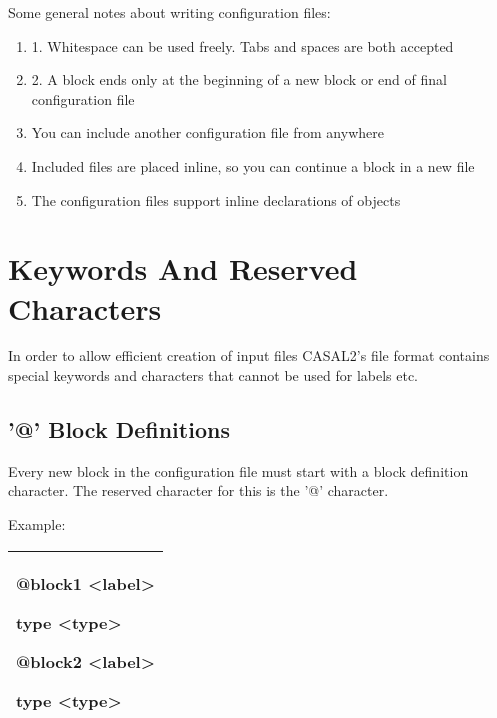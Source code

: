 \documentclass[a4paper,11pt,twoside,pdftex,draft]{article}
\providecommand{\tightlist}{%
  \setlength{\itemsep}{0pt}\setlength{\parskip}{0pt}}
\begin{document}
Some general notes about writing configuration files:

\begin{enumerate}
\def\labelenumi{\arabic{enumi}.}
\tightlist
\item
  1. Whitespace can be used freely. Tabs and spaces are both accepted
\item
  2. A block ends only at the beginning of a new block or end of final
  configuration file
\item
  You can include another configuration file from anywhere
\item
  Included files are placed inline, so you can continue a block in a new
  file
\item
  The configuration files support inline declarations of objects
\end{enumerate}

\hypertarget{keywords-and-reserved-characters}{%
\section[Keywords And Reserved
Characters]{\texorpdfstring{\protect\hypertarget{anchor-2}{}{}Keywords
And Reserved
Characters}{Keywords And Reserved Characters}}\label{keywords-and-reserved-characters}}

In order to allow efficient creation of input files CASAL2's file format
contains special keywords and characters that cannot be used for labels
etc.

\hypertarget{block-definitions}{%
\subsection{'@' Block Definitions}\label{block-definitions}}

Every new block in the configuration file must start with a block
definition character. The reserved character for this is the '@'
character.

Example:

\begin{longtable}[]{@{}l@{}}
\toprule
\endhead
\begin{minipage}[t]{0.97\columnwidth}\raggedright
@block1 \textless label\textgreater{}

type \textless type\textgreater{}

@block2 \textless label\textgreater{}

type \textless type\textgreater{}\strut
\end{minipage}\tabularnewline
\bottomrule
\end{longtable}
\end{document}
